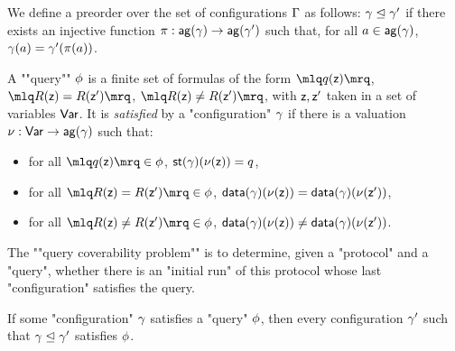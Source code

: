 \begin{definition}
We define a preorder over the set of configurations $\Gamma$ as follows: $\gamma \trianglelefteq \gamma'$ if there exists an injective function $\pi: \mathsf{ag}(\gamma) \rightarrow \mathsf{ag}(\gamma')$ such that, for all $a \in \mathsf{ag}(\gamma)$, $\gamma(a) = \gamma'(\pi(a))$. 
\end{definition}

\begin{definition}
	A ""query"" $\phi$ is a finite set of formulas of the form $\quotemarks{q(\var{z})}$, $\quotemarks{R(\var{z}) = R(\var{z}')}$, $\quotemarks{R(\var{z}) \neq R(\var{z}')}$, with $\mathsf{z}, \mathsf{z}'$ taken in a set of variables $\mathsf{Var}$.
	It is \emph{satisfied} by a "configuration" $\gamma$ if there is a valuation $\nu : \mathsf{Var} \to \mathsf{ag}(\gamma)$ such that:
	\begin{itemize}
		\item for all $\quotemarks{q(\var{z})} \in \query$, $\mathsf{st}(\gamma)(\nu(\mathsf{z})) = q$,
		
		\item for all $\quotemarks{R(\var{z}) = R(\var{z'})} \in \query$, $\mathsf{data}(\gamma)(\nu(\mathsf{z})) = \mathsf{data}(\gamma)(\nu(\mathsf{z'}))$,
		
		\item for all $\quotemarks{R(\var{z}) \neq R(\var{z'})} \in \query$, $\mathsf{data}(\gamma)(\nu(\mathsf{z})) \neq \mathsf{data}(\gamma)(\nu(\mathsf{z'}))$.
	\end{itemize}

	\AP The ""query coverability problem"" is to determine, given a "protocol" and a "query", whether there is an "initial run" of this protocol whose last "configuration" satisfies the query.
\end{definition}

\begin{remark}
\label{rem:bigger_config_query}
If some "configuration" $\gamma$ satisfies a "query" $\phi$, then every configuration $\gamma'$ such that $\gamma \trianglelefteq \gamma'$ satisfies $\phi$. 
\end{remark}




